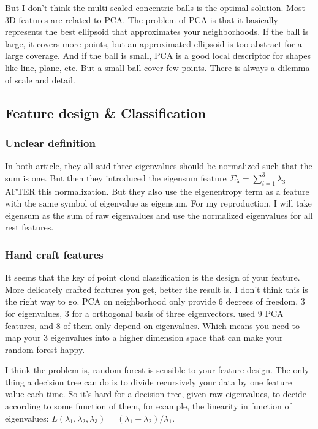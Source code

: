 \documentclass{article}
\begin{document}
But I don't think the multi-scaled concentric balls is the optimal solution. Most 3D features are related to PCA. The problem of PCA is that it basically represents the best ellipsoid that approximates your neighborhoods. If the ball is large, it covers more points, but an approximated ellipsoid is too abstract for a large coverage. And if the ball is small, PCA is a good local descriptor for shapes like line, plane, etc. But a small ball cover few points. There is always a dilemma of scale and detail.

\subsection{Feature design \& Classification}
\subsubsection{Unclear definition}
In both article, they all said three eigenvalues should be normalized such that the sum is one. But then they introduced the eigensum feature $\Sigma_\lambda = \sum_{i=1}^{3} \lambda_3$ AFTER this normalization. But they also use the eigenentropy term as a feature with the same symbol of eigenvalue as eigensum. For my reproduction, I will take eigensum as the sum of raw eigenvalues and use the normalized eigenvalues for all rest features.

\subsubsection{Hand craft features}\label{sec:features}
It seems that the key of point cloud classification is the design of your feature. More delicately crafted features you get, better the result is. I don't think this is the right way to go. PCA on neighborhood only provide 6 degrees of freedom, 3 for eigenvalues, 3 for a orthogonal basis of three eigenvectors. \cite{hackel2016fast} used 9 PCA features, and 8 of them only depend on eigenvalues. Which means you need to map your 3 eigenvalues into a higher dimension space that can make your random forest happy. 

I think the problem is, random forest is sensible to your feature design. The only thing a decision tree can do is to divide recursively your data by one feature value each time. So it's hard for a decision tree, given raw eigenvalues, to decide according to some function of them, for example, the linearity in function of eigenvalues: $L(\lambda_1,\lambda_2,\lambda_3) = (\lambda_1-\lambda_2)/\lambda_1$.
\end{document}
